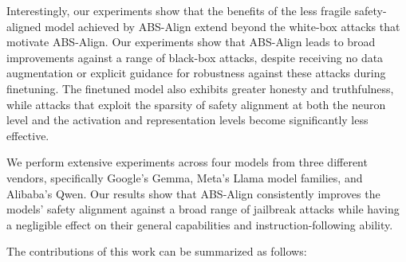 Interestingly, our experiments show that the benefits of the less fragile safety-aligned model achieved by ABS-Align extend beyond the white-box attacks that motivate ABS-Align. Our experiments show that ABS-Align leads to broad improvements against a range of black-box attacks, despite receiving no data augmentation or explicit guidance for robustness against these attacks during finetuning. The finetuned model also exhibits greater honesty and truthfulness, while attacks that exploit the sparsity of safety alignment at both the neuron level and the activation and representation levels become significantly less effective. 

We perform extensive experiments across four models from three different vendors, specifically Google's Gemma, Meta's Llama model families, and Alibaba's Qwen. Our results show that ABS-Align consistently improves the models' safety alignment against a broad range of jailbreak attacks while having a negligible effect on their general capabilities and instruction-following ability.

The contributions of this work can be summarized as follows:

